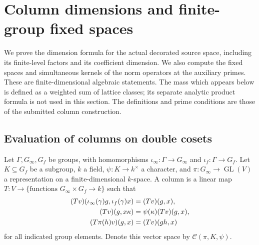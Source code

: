 \section{Column dimensions and finite-group fixed spaces}
\label{cd-section}

We prove the dimension formula for the actual decorated source
space, including its finite-level factors and its coefficient
dimension. We also compute the fixed spaces and simultaneous
kernels of the norm operators at the auxiliary primes.
These are finite-dimensional algebraic statements. The mass which
appears below is defined as a weighted sum of lattice classes;
its separate analytic product formula is not used in this section.
The definitions and prime conditions are those of the submitted
column construction.\cite{alpo-uniform-source}

\subsection{Evaluation of columns on double cosets}

Let $\Gamma,G_\infty,G_f$ be groups, with homomorphisms
$\iota_\infty:\Gamma\to G_\infty$ and
$\iota_f:\Gamma\to G_f$. Let $K\subseteq G_f$ be a subgroup,
$k$ a field, $\psi:K\to k^\times$ a character, and
$\pi:G_\infty\to\operatorname{GL}(V)$ a representation on a
finite-dimensional $k$-space. A column is a linear map
$T:V\to\{\text{functions }G_\infty\times G_f\to k\}$ such that
\begin{align}
 (Tv)(\iota_\infty(\gamma)g,\iota_f(\gamma)x)
       &=(Tv)(g,x),\notag\\
 (Tv)(g,x\kappa)&=\psi(\kappa)(Tv)(g,x),\notag\\
 (T\pi(h)v)(g,x)&=(Tv)(gh,x)
 \label{cd-column-equivariance}
\end{align}
for all indicated group elements. Denote this vector space by
$\mathcal C(\pi,K,\psi)$.

